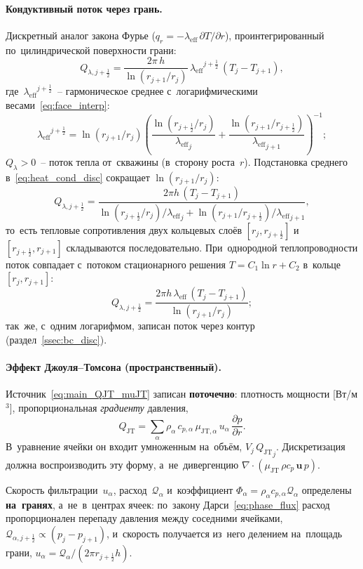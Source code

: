 \documentclass[12pt,a4paper]{article}
\newcommand{\half}{\tfrac{1}{2}}
\newcommand{\pdr}[1]{\frac{\partial #1}{\partial r}}
\newcommand{\leff}{\lambda_{\mathrm{eff}}}
\newcommand{\QJT}{Q_{\mathrm{JT}}}
\begin{document}
\paragraph{Кондуктивный поток через грань.}
Дискретный аналог закона Фурье ($q_r = -\leff\,\partial T/\partial r$),
проинтегрированный по~цилиндрической поверхности грани:
\begin{equation}\label{eq:heat_cond_disc}
  Q_{\lambda,j+\half} = \frac{2\pi\,h}{\ln(r_{j+1}/r_j)}\,
    {\leff}^{j+\half}\,(T_j - T_{j+1}),
\end{equation}
где~${\leff}^{j+\half}$~-- гармоническое среднее
с~логарифмическими весами~\eqref{eq:face_interp}:
\[
  {\leff}^{j+\half} = \ln(r_{j+1}/r_j)
    \left( \dfrac{\ln(r_{j+\half}/r_j)}{{\leff}_j}
    + \dfrac{\ln(r_{j+1}/r_{j+\half})}{{\leff}_{j+1}}\right)^{-1};
\]
$Q_\lambda > 0$~-- поток тепла от~скважины (в~сторону роста~$r$).
Подстановка среднего в~\eqref{eq:heat_cond_disc} сокращает
$\ln(r_{j+1}/r_j)$:
\[
  Q_{\lambda,j+\half}
  = \frac{2\pi h\,(T_j - T_{j+1})}
    {\ln(r_{j+\half}/r_j)/{\leff}_j + \ln(r_{j+1}/r_{j+\half})/{\leff}_{j+1}},
\]
то~есть тепловые сопротивления двух кольцевых слоёв
$[r_j, r_{j+\half}]$ и~$[r_{j+\half}, r_{j+1}]$ складываются
последовательно. При~однородной теплопроводности поток совпадает
с~потоком стационарного решения $T = C_1\ln r + C_2$ в~кольце
$[r_j, r_{j+1}]$:
\[
  Q_{\lambda,j+\half} = \frac{2\pi h\,\leff\,(T_j - T_{j+1})}{\ln(r_{j+1}/r_j)};
\]
так~же, с~одним логарифмом, записан поток через контур
(раздел~\ref{ssec:bc_disc}).

\paragraph{Эффект Джоуля--Томсона (пространственный).}
Источник~\eqref{eq:main_QJT_muJT} записан \textbf{поточечно}:
плотность мощности [Вт/м$^3$], пропорциональная \emph{градиенту}
давления,
\[
  \QJT
  = \sum_\alpha \rho_\alpha\,c_{p,\alpha}\,
    \mu_{\mathrm{JT},\alpha}\,u_\alpha\,\pdr{p}.
\]
В~уравнение ячейки он входит умноженным на~объём, $V_j\,{\QJT}_j$.
Дискретизация должна воспроизводить эту форму, а~не~дивергенцию
$\nabla\!\cdot\!(\mu_{\mathrm{JT}}\,\rho c_p\,\mathbf{u}\,p)$.

Скорость фильтрации~$u_\alpha$, расход~$\mathcal{Q}_\alpha$
и~коэффициент $\Phi_\alpha = \rho_\alpha c_{p,\alpha}\mathcal{Q}_\alpha$
определены \textbf{на~гранях}, а~не~в~центрах ячеек: по~закону
Дарси~\eqref{eq:phase_flux} расход пропорционален перепаду давления
между соседними ячейками, $\mathcal{Q}_{\alpha,j+\half} \propto
(p_j - p_{j+1})$, и~скорость получается из~него делением
на~площадь грани, $u_\alpha = \mathcal{Q}_\alpha/(2\pi r_{j+\half} h)$.
\end{document}
